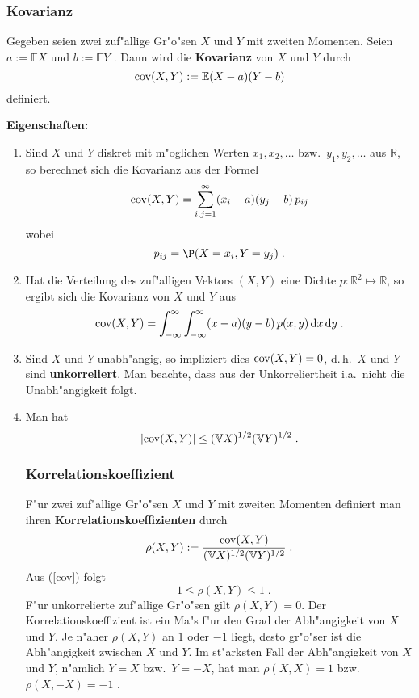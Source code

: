 \documentclass[ngerman,draft,parskip=half,twoside]{scrartcl}
\newcommand*{\R}{\mathbb{R}}      %
\newcommand*{\E}{\mathbb{E}}        %
\newcommand*{\V}{\mathbb{V}}        %
\begin{document}
\subsubsection{Kovarianz}
Gegeben seien zwei zuf"allige Gr"o"sen $X$ und $Y$ mit zweiten Momenten.
Seien $a:=\E X$ und $b:=\E Y$ . Dann wird die \textbf{Kovarianz} von $X$ und $Y$ durch
$$
{\rm  cov}(X,Y):= \E(X-a)(Y-b)
$$
definiert.

\textbf{Eigenschaften:}

\begin{enumerate}
\item
Sind $X$ und $Y$ diskret mit m"oglichen Werten $x_1,x_2,\ldots$ bzw.~$y_1,y_2,\ldots$ aus $\R$,
so berechnet sich die Kovarianz aus der Formel
$$
{\rm  cov}(X,Y)=\sum_{i,j=1}^\infty (x_i-a)(y_j-b)\, p_{ij}
$$
wobei
$$
p_{ij}=\P(X=x_i, Y=y_j)\;.
$$
\item
Hat die Verteilung des zuf"alligen Vektors $(X,Y)$ eine Dichte $p \colon\R^2\mapsto\R$, so
ergibt sich die Kovarianz von $X$ und $Y$ aus
$$
{\rm  cov}(X,Y)=\int_{-\infty}^\infty \int_{-\infty}^\infty (x-a)(y-b)\,p(x,y)\,\mathrm d x\, \mathrm d y\;.
$$
\item
Sind $X$ und $Y$ unabh"angig, so impliziert dies ${\rm  cov}(X,Y)=0$, d.\,h.~$X$ und $Y$ sind
\textbf{unkorreliert}. Man beachte, dass aus der Unkorreliertheit i.a.~nicht die Unabh"angigkeit folgt.
\item
Man hat
\begin{equation}
\label{cov}
|{\rm  cov}(X,Y)|\le (\V X)^{1/2}(\V Y)^{1/2}\;.
\end{equation}
\subsubsection{Korrelationskoeffizient}
F"ur zwei zuf"allige Gr"o"sen $X$ und $Y$ mit zweiten Momenten definiert man ihren
\textbf{Korrelationskoeffizienten} durch
$$
\rho(X,Y):=\frac{{\rm  cov}(X,Y)}{(\V X)^{1/2}(\V Y)^{1/2}}\;.
$$
Aus (\ref{cov}) folgt
$$
-1\le \rho(X,Y)\le 1\;.
$$
F"ur unkorrelierte zuf"allige Gr"o"sen gilt $\rho(X,Y)=0$.
 Der Korrelationskoeffizient ist ein Ma"s f"ur den Grad der Abh"angigkeit von
$X$ und $Y$. Je n"aher $\rho(X,Y)$ an $1$ oder $-1$ liegt, desto gr"o"ser ist die
Abh"angigkeit zwischen $X$ und $Y$. Im st"arksten Fall
der Abh"angigkeit von $X$ und $Y$, n"amlich $Y=X$ bzw.~$Y=-X$, hat man $\rho(X,X)=1$ bzw.~$\rho(X,-X)=-1$ .
\end{enumerate}
\end{document}
